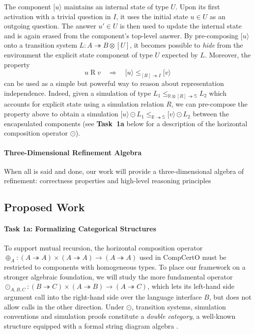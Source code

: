 The component $[u\rangle$ maintains an internal state of type $U$.
Upon its first activation with a trivial question in $I$,
it uses the initial state $u \in U$
as an outgoing question.
The answer $u' \in U$ is then used to update the internal state
and is again erased from the component's top-level answer.
By pre-composing $[u\rangle$ onto a transition system
$L : A \twoheadrightarrow B \otimes [U]$,
it becomes possible to \emph{hide} from the environment
the explicit state component of type $U$ expected by $L$.
Moreover,
the property
\[
  u \mathrel{R} v
  \quad \Rightarrow \quad
  [u\rangle \le_{[R] \twoheadrightarrow I} [v\rangle
\]
can be used as a simple but powerful way
to reason about representation independence.
Indeed,
given a simulation of type
$L_1 \le_{\mathbb{R} \otimes [R] \twoheadrightarrow \mathbb{S}} L_2$
which accounts for explicit state
using a simulation relation $R$,
we can pre-compose the property above to obtain a simulation
$[u\rangle \odot L_1
 \le_{\mathbb{R} \twoheadrightarrow \mathbb{S}}
 [v\rangle \odot L_2$
between the encapsulated components
(see \textbf{Task~1a} below for a description of the horizontal composition operator $\odot$).


\paragraph{Three-Dimensional Refinement Algebra}

When all is said and done,
our work will provide a three-dimensional algebra of refinement:
correctness properties and high-level reasoning principles

\subsection{Proposed Work}

\paragraph*{Task 1a: Formalizing Categorical Structures}

To support mutual recursion,
the horizontal composition operator
${\oplus_A} : (A \twoheadrightarrow A) \times (A \twoheadrightarrow A)
  \rightarrow (A \twoheadrightarrow A)$
used in CompCertO
must be restricted to components with homogeneous types.
To place our framework on a stronger algebraic foundation,
we will study the more fundamental operator
${\odot_{A,B,C}} : (B \twoheadrightarrow C) \times (A \twoheadrightarrow B)
  \rightarrow (A \twoheadrightarrow C)$,
which lets its left-hand side argument call into
the right-hand side over the language interface $B$,
but does not allow calls in the other direction.
Under $\odot$,
transition systems, simulation conventions and simulation proofs
constitute a \emph{double category},
a well-known structure equipped with a formal string diagram algebra
\cite{dcsd}.

